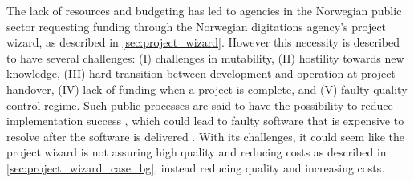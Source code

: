 
The lack of resources and budgeting has led to agencies in the Norwegian public sector requesting funding through the Norwegian digitations agency's project wizard, as described in \autoref{sec:project_wizard}. However this necessity is described to have several challenges: (I) challenges in mutability, (II) hostility towards new knowledge, (III) hard transition between development and operation at project handover, (IV) lack of funding when a project is complete, and (V) faulty quality control regime. Such public processes are said to have the possibility to reduce implementation success \cite{jc_2010}, which could lead to faulty software that is expensive to resolve after the software is delivered \cite{csw_2011}. With its challenges, it could seem like the project wizard is not assuring high quality and reducing costs as described in \autoref{sec:project_wizard_case_bg}, instead reducing quality and increasing costs.


